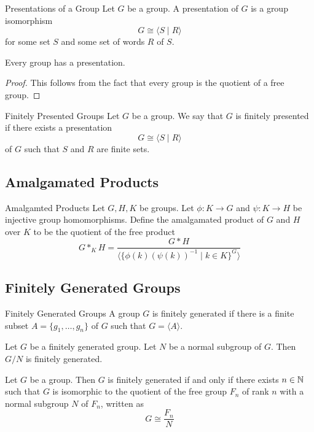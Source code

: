 \documentclass[a4paper]{article}
\begin{document}
\begin{defn}{Presentations of a Group}{} Let $G$ be a group. A presentation of $G$ is a group isomorphism $$G\cong\langle S\;|\;R\rangle$$ for some set $S$ and some set of words $R$ of $S$. 
\end{defn}

\begin{prp}{}{} Every group has a presentation. 
\begin{proof}
This follows from the fact that every group is the quotient of a free group. 
\end{proof}
\end{prp}

\begin{defn}{Finitely Presented Groups}{} Let $G$ be a group. We say that $G$ is finitely presented if there exists a presentation $$G\cong\langle S\;|\;R\rangle$$ of $G$ such that $S$ and $R$ are finite sets. 
\end{defn}

\subsection{Amalgamated Products}
\begin{defn}{Amalgamted Products}{} Let $G,H,K$ be groups. Let $\phi:K\to G$ and $\psi:K\to H$ be injective group homomorphisms. Define the amalgamated product of $G$ and $H$ over $K$ to be the quotient of the free product $$G\ast_KH=\frac{G\ast H}{\langle\{\phi(k)(\psi(k))^{-1}\;|\;k\in K\}^G\rangle}$$
\end{defn}

\subsection{Finitely Generated Groups}
\begin{defn}{Finitely Generated Groups}{} A group $G$ is finitely generated if there is a finite subset $A=\{g_1,\dots,g_n\}$ of $G$ such that $G=\langle A\rangle$. 
\end{defn}

\begin{prp}{}{} Let $G$ be a finitely generated group. Let $N$ be a normal subgroup of $G$. Then $G/N$ is finitely generated. 
\end{prp}

\begin{prp}{}{} Let $G$ be a group. Then $G$ is finitely generated if and only if there exists $n\in\mathbb{N}$ such that $G$ is isomorphic to the quotient of the free group $F_n$ of rank $n$ with a normal subgroup $N$ of $F_n$, written as $$G\cong\frac{F_n}{N}$$
\end{prp}
\end{document}
